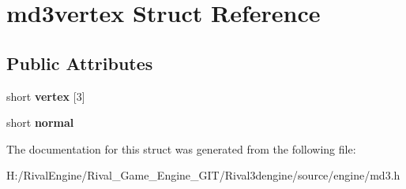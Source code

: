 \hypertarget{structmd3vertex}{}\section{md3vertex Struct Reference}
\label{structmd3vertex}
\subsection*{Public Attributes}
\begin{DoxyCompactItemize}
\item 
\mbox{\label{structmd3vertex_a9e83865d8671433e1aebd686b6a60298}} 
short {\bfseries vertex} \mbox{[}3\mbox{]}
\item 
\mbox{\label{structmd3vertex_a6421198d39c1247f954d7d2db9b2ae71}} 
short {\bfseries normal}
\end{DoxyCompactItemize}


The documentation for this struct was generated from the following file\+:\begin{DoxyCompactItemize}
\item 
H\+:/\+Rival\+Engine/\+Rival\+\_\+\+Game\+\_\+\+Engine\+\_\+\+G\+I\+T/\+Rival3dengine/source/engine/md3.\+h\end{DoxyCompactItemize}

